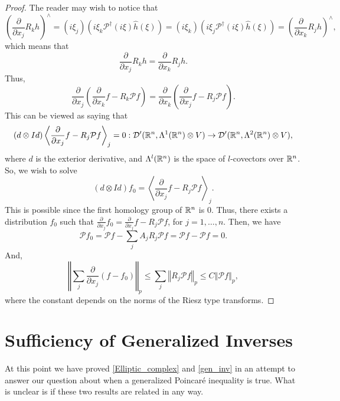 \documentclass{amsart}
\theoremstyle{definition}
\numberwithin{equation}{section}
\begin{document}
\begin{proof}
The reader may wish to notice that $$\left(\frac {\partial} {\partial x_j} R_k h\right)^\wedge = \left(i \xi_j\right) \left(i \xi_k{\mathcal{P}}^\dagger (i\xi) \widehat{h}(\xi)\right) = \left(i \xi_k\right) \left(i \xi_j{\mathcal{P}}^\dagger (i\xi) \widehat{h}(\xi)\right) = \left(\frac {\partial} {\partial x_k} R_j h\right)^\wedge,$$ which means that $$\frac {\partial} {\partial x_j} R_k h = \frac {\partial} {\partial x_k} R_j h.$$  Thus, $$\frac {\partial} {\partial x_j} \left(\frac {\partial}{\partial x_k} f - R_k {\mathcal{P}} f\right) = \frac {\partial} {\partial x_k} \left(\frac {\partial}{\partial x_j} f - R_j {\mathcal{P}} f\right).$$This can be viewed as saying that $$\left(d\otimes Id\right) \left<\frac {\partial}{\partial x_j} f - R_j {\mathcal{P}} f\right>_j =0 : {\mathcal{D}}'(\Bbb R^n, {\Lambda}^1(\Bbb R^n)\otimes V) \to {\mathcal{D}}'(\Bbb R^n, {\Lambda}^2(\Bbb R^n)\otimes V),$$ where $d$ is the exterior derivative, and ${\Lambda}^l(\Bbb R^n)$ is the space of $l$-covectors over $\Bbb R^n$.  So, we wish to solve $$(d\otimes Id)f_0 = \left<\frac {\partial}{\partial x_j} f - R_j {\mathcal{P}} f\right>_j.$$  This is possible since the first homology group of $\Bbb R^n$ is $0$.  Thus, there exists a distribution $f_0$ such that $\frac {\partial}{\partial x_j} f_0 = \frac {\partial}{\partial x_j} f - R_j {\mathcal{P}} f$, for $j=1, \dots, n$.  Then, we have $${\mathcal{P}} f_0 = {\mathcal{P}} f - \sum_j A_j R_j {\mathcal{P}} f = {\mathcal{P}} f - {\mathcal{P}} f =0.$$  And, $${\left\Vert{\sum_j \frac {\partial}{\partial x_j} \left(f-f_0\right)}\right\Vert}_{p} \leq \sum_j {\left\Vert{R_j {\mathcal{P}} f}\right\Vert}_p \leq C {\left\Vert{{\mathcal{P}} f}\right\Vert}_p,$$ where the constant depends on the norms of the Riesz type transforms.
\end{proof}

\section{Sufficiency of Generalized Inverses}\label{SGI}

At this point we have proved \autoref{Elliptic_complex} and \autoref{gen_inv} in an attempt to answer our question about when a generalized Poincar\'{e} inequality is true.  What is unclear is if these two results are related in any way.  
\end{document}
